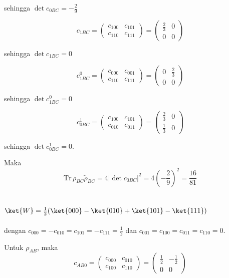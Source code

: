 sehingga $\det c_{0BC} = -\frac{2}{9}$

\begin{equation}
	c_{1BC}=
	\begin{pmatrix}
		c_{100} & c_{101} \\
		c_{110} & c_{111}
	\end{pmatrix}=
	\begin{pmatrix}
		\frac{2}{3} & 0 \\
		0 & 0
	\end{pmatrix}
\end{equation}

sehingga $\det c_{1BC} = 0$

\begin{equation}
	c_{1BC}^0=
	\begin{pmatrix}
		c_{000} & c_{001} \\
		c_{110} & c_{111}
	\end{pmatrix}=
	\begin{pmatrix}
		0 & \frac{2}{3} \\
		0 & 0
	\end{pmatrix}
\end{equation}

sehingga $\det c_{1BC}^0 = 0$

\begin{equation}
	c_{0BC}^1=
	\begin{pmatrix}
		c_{100} & c_{101} \\
		c_{010} & c_{011}
	\end{pmatrix}=
	\begin{pmatrix}
		\frac{2}{3} & 0 \\
		\frac{1}{3} & 0
	\end{pmatrix}
\end{equation}

sehingga $\det c_{0BC}^1 = 0$.

Maka
\begin{equation}
	\mathrm{Tr}\,\rho_{BC}\tilde{\rho}_{BC}=4|\det c_{0BC}|^2=4(-\frac{2}{9})^2=\frac{16}{81}
\end{equation}

\subsection{ $\ket{W}=\frac{1}{2}(\ket{000}-\ket{010}+\ket{101}-\ket{111})$}
dengan $c_{000}=-c_{010}=c_{101}=-c_{111}=\frac{1}{2}$ dan $c_{001}=c_{100}=c_{011}=c_{110}=0$.

Untuk $\rho_{AB}$, maka
\begin{equation}
	c_{AB0}=
	\begin{pmatrix}
		c_{000} & c_{010} \\
		c_{100} & c_{110}
	\end{pmatrix}=
	\begin{pmatrix}
		\frac{1}{2} & -\frac{1}{2} \\
		0 & 0
	\end{pmatrix}
\end{equation}

